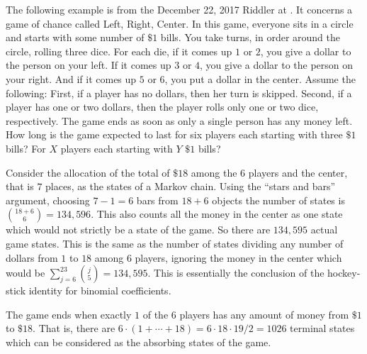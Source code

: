 \documentclass[12pt]{article}
\begin{document}
\begin{example}
  The following example is from the December 22, 2017 Riddler at
  .
  It concerns a game of chance called Left, Right, Center. In this
  game, everyone sits in a circle and starts with some number of $\$1$
  bills. You take turns, in order around the circle, rolling three
  dice. For each die, if it comes up $1$ or $2$, you give a dollar to
  the person on your left. If it comes up $3$ or $4$, you give a
  dollar to the person on your right. And if it comes up $5$ or $6$,
  you put a dollar in the center.  Assume the following: First, if a
  player has no dollars, then her turn is skipped. Second, if a player
  has one or two dollars, then the player rolls only one or two dice,
  respectively. The game ends as soon as only a single person has any
  money left. How long is the game expected to last for six players
  each starting with three $\$1$ bills? For $X$ players each starting
  with $Y$ $\$1$ bills?

  Consider the allocation of the total of $\$18$ among the $6$ players
  and the center, that is $7$ places, as the states of a Markov
  chain.  Using the ``stars and bars'' argument, choosing $7-1 = 6$ bars
  from $18 + 6$ objects the number of states is
  $\binom{18+6}{6} = 134{,}596$.  This also counts all the money in the
  center as one state which would not strictly be a state of the
  game.  So there are $134{,}595$ actual game states.  This is the same as the number of
  states dividing any number of dollars from $1$ to $18$ among $6$
  players, ignoring the money in the center which would be
  $\sum\limits_{j=6}^{23}\binom{j}{5} = 134{,}595$.  This is essentially the
  conclusion of the hockey-stick identity for binomial coefficients.

  The game ends when exactly $1$ of the $6$ players has any amount of
  money from $\$1$ to $\$18$.  That is, there are $6 \cdot (1 + \cdots
  + 18) = 6 \cdot 18 \cdot 19/2 = 1026$ terminal states which can be
  considered as the absorbing states of the game.


\end{example}
\end{document}
